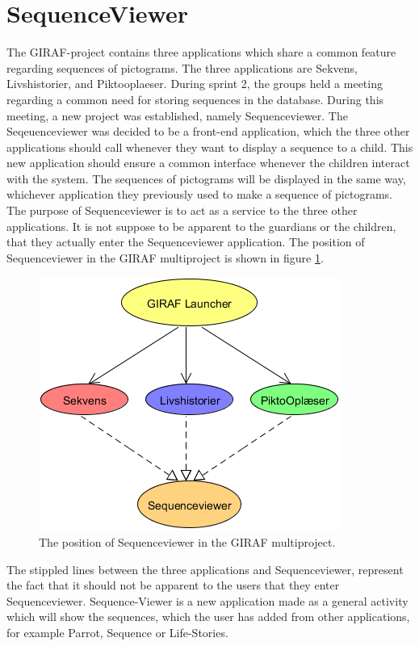 \section{SequenceViewer}\label{sec:sequenceviewer}
The GIRAF-project contains three applications which share a common feature regarding sequences of pictograms. The three applications are Sekvens, Livshistorier, and Piktooplaeser. During sprint 2, the groups held a meeting regarding a common need for storing sequences in the database. During this meeting, a new project was established, namely Sequenceviewer. The Seqeuenceviewer was decided to be a front-end application, which the three other applications should call whenever they want to display a sequence to a child. This new application should ensure a common interface whenever the children interact with the system. The sequences of pictograms will be displayed in the same way, whichever application they previously used to make a sequence of pictograms.
The purpose of Sequenceviewer is to act as a service to the three other applications. It is not suppose to be apparent to the guardians or the children, that they actually enter the Sequenceviewer application. The position of Sequenceviewer in the GIRAF multiproject is shown in figure \ref{fig:sequenceviewer}.
\begin{figure}[H]
	\centering
	\includegraphics[scale=0.8]{Pics/sequenceviewer}
	\caption{The position of Sequenceviewer in the GIRAF multiproject.}
	\label{fig:sequenceviewer}
\end{figure}
The stippled lines between the three applications and Sequenceviewer, represent the fact that it should not be apparent to the users that they enter Sequenceviewer.
Sequence-Viewer is a new application made as a general activity which will show the sequences, which the user has added from other applications, for example Parrot, Sequence or Life-Stories.
